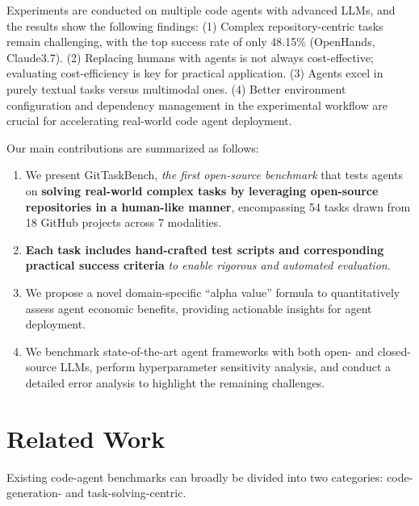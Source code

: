 \documentclass[letterpaper]{article} %
\begin{document}
Experiments are conducted on multiple code agents with advanced LLMs, and the results show the following findings: (1) Complex repository-centric tasks remain challenging, with the top success rate of only 48.15\% (OpenHands, Claude3.7). (2) Replacing humans with agents is not always cost-effective; evaluating cost-efficiency is key for practical application. (3) Agents excel in purely textual tasks versus multimodal ones. (4) Better environment configuration and dependency management in the experimental workflow are crucial for accelerating real-world code agent deployment. 

Our main contributions are summarized as follows:
\begin{enumerate}
    \item We present GitTaskBench, \textit{the first open-source benchmark} that tests agents on \textbf{solving real-world complex tasks by leveraging open-source repositories in a human-like manner}, encompassing 54 tasks drawn from 18 GitHub projects across 7 modalities.
    \item \textbf{Each task includes hand-crafted test scripts and corresponding practical success criteria} \textit{to enable rigorous and automated evaluation}. 
    \item We propose a novel domain-specific “alpha value” formula to quantitatively assess agent economic benefits, providing actionable insights for agent deployment.
    \item We benchmark state-of-the-art agent frameworks with both open- and closed-source LLMs, perform hyperparameter sensitivity analysis, and conduct a detailed error analysis to highlight the remaining challenges.
\end{enumerate}


\section{Related Work}
Existing code-agent benchmarks can broadly be divided into two categories: code-generation- and task-solving-centric. 
\end{document}
